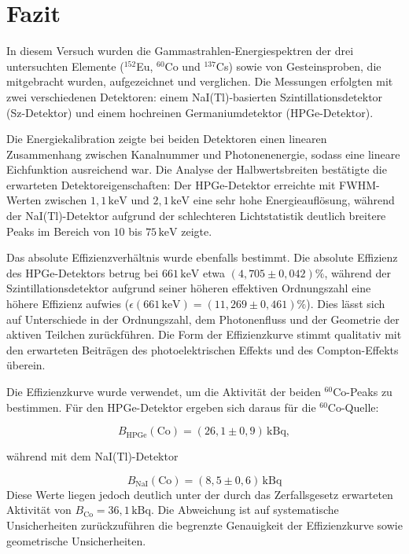 \chapter{Fazit}
In diesem Versuch wurden die Gammastrahlen-Energiespektren der drei untersuchten Elemente ($^{152}$Eu, $^{60}$Co und $^{137}$Cs) sowie von Gesteinsproben, die  mitgebracht wurden, aufgezeichnet und verglichen. Die Messungen erfolgten mit zwei verschiedenen Detektoren: einem NaI(Tl)-basierten Szintillationsdetektor (Sz-Detektor) und einem hochreinen Germaniumdetektor (HPGe-Detektor).

Die Energiekalibration zeigte bei beiden Detektoren einen linearen Zusammenhang zwischen Kanalnummer und Photonenenergie, sodass eine lineare Eichfunktion ausreichend war. Die Analyse der Halbwertsbreiten bestätigte die erwarteten Detektoreigenschaften: Der HPGe-Detektor erreichte mit FWHM-Werten zwischen $1,1\,\mathrm{keV}$ und $2,1\,\mathrm{keV}$ eine sehr hohe Energieauflösung,
während der NaI(Tl)-Detektor aufgrund der schlechteren Lichtstatistik deutlich breitere Peaks im Bereich von $10$ bis $75\,\mathrm{keV}$ zeigte.

Das absolute Effizienzverhältnis wurde ebenfalls bestimmt. Die absolute Effizienz des HPGe-Detektors betrug bei $661\,\mathrm{keV}$ etwa $(4,705 \pm0,042)\%$, während der Szintillationsdetektor aufgrund seiner höheren effektiven Ordnungszahl eine höhere Effizienz aufwies ($\epsilon(661\,\text{keV}) = (11,269\pm0,461)\%$). Dies lässt sich auf Unterschiede in der Ordnungszahl, dem Photonenfluss und der Geometrie der aktiven Teilchen zurückführen. Die Form der Effizienzkurve stimmt qualitativ mit den erwarteten Beiträgen des photoelektrischen Effekts und des Compton-Effekts überein.


Die Effizienzkurve wurde verwendet, um die Aktivität der beiden $^{60}$Co-Peaks zu bestimmen. Für den HPGe-Detektor ergeben sich daraus für die $^{60}$Co-Quelle:


\[
B_{\mathrm{HPGe}}(\text{Co}) = (26,1 \pm 0,9)\,\mathrm{kBq},
\]

während mit dem NaI(Tl)-Detektor

\[
B_{\mathrm{NaI}}(\text{Co}) = (8,5 \pm 0,6)\,\mathrm{kBq}
\]
Diese Werte liegen jedoch deutlich unter der durch das Zerfallsgesetz erwarteten Aktivität von $B_{\mathrm{Co}} = 36,1\,\mathrm{kBq}$. Die Abweichung ist auf systematische Unsicherheiten zurückzuführen die begrenzte Genauigkeit der Effizienzkurve sowie geometrische Unsicherheiten.

